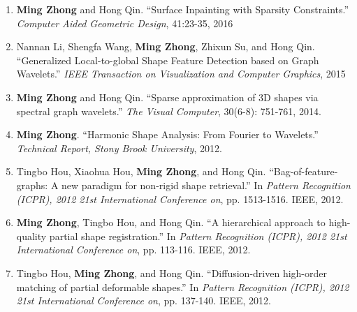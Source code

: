 \documentclass[12pt,letterpaper,twosided]{report}
\numberwithin{equation}{section}
\begin{document}
\begin{enumerate}
\item \textbf{Ming Zhong} and Hong Qin. ``Surface Inpainting with Sparsity Constraints.'' \emph{Computer Aided Geometric Design}, 41:23-35, 2016
\item Nannan Li, Shengfa Wang, \textbf{Ming Zhong}, Zhixun Su, and Hong Qin. ``Generalized Local-to-global Shape Feature Detection based on Graph Wavelets.'' \emph{IEEE Transaction on Visualization and Computer Graphics}, 2015
\item \textbf{Ming Zhong} and Hong Qin. ``Sparse approximation of 3D shapes via spectral graph wavelets.'' \emph{The Visual Computer}, 30(6-8): 751-761, 2014.
\item \textbf{Ming Zhong}. ``Harmonic Shape Analysis: From Fourier to Wavelets.'' \emph{Technical Report, Stony Brook University}, 2012.
\item Tingbo Hou, Xiaohua Hou, \textbf{Ming Zhong}, and Hong Qin. ``Bag-of-feature-graphs: A new paradigm for non-rigid shape retrieval.'' In \emph{Pattern Recognition (ICPR), 2012 21st International Conference on}, pp. 1513-1516. IEEE, 2012.
\item \textbf{Ming Zhong}, Tingbo Hou, and Hong Qin. ``A hierarchical approach to high-quality partial shape registration.'' In \emph{Pattern Recognition (ICPR), 2012 21st International Conference on}, pp. 113-116. IEEE, 2012.
\item Tingbo Hou, \textbf{Ming Zhong}, and Hong Qin. ``Diffusion-driven high-order matching of partial deformable shapes.'' In \emph{Pattern Recognition (ICPR), 2012 21st International Conference on}, pp. 137-140. IEEE, 2012.
\end{enumerate}

\newpage
\pagestyle{fancy}
\fancyhead{}
\fancyhead[RO,LE]{\thepage}
\fancyhead[LO]{\leftmark}
\fancyhead[RE]{\rightmark}
\fancyfoot{}
\renewcommand{\headrulewidth}{0.5pt}

\graphicspath{{fig-intro/}}

\graphicspath{{fig-background/}}

\graphicspath{{fig-approximation/}}

\graphicspath{{fig-inpainting/}}

\graphicspath{{fig-feature/}}

\graphicspath{{fig-matching/}}




{}


\end{document}
